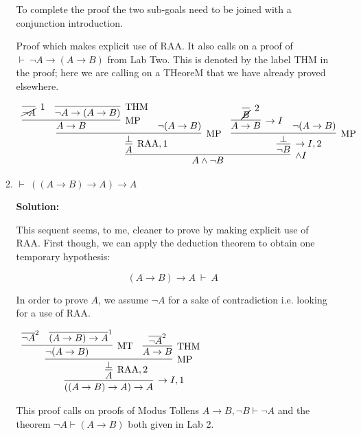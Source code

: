 \documentclass[11pt]{report}
\newcommand{\temp}[2]{{\overline{#2}}^{#1}}
\begin{document}
\begin{enumerate}
\begin{enumerate}
		To complete the proof the two sub-goals need to be joined with a conjunction introduction. 



		Proof which makes explicit use of RAA. It also calls on a proof of $\vdash \ \lnot A \to (A \to B)$ from Lab Two. This is denoted by the label THM in the proof; here we are calling on a THeoreM that we have already proved elsewhere.

		\begin{footnotesize}
		\begin{center}
			$\begin{array}{c}
				\infer[\land I]{A \land \lnot B}
					{\infer[\RAA,1]{A}
						{\infer[\MP]{\bot}
							{\infer[\MP]{A \to B}
								{\infer[1]{\cancel{\lnot A}}{}
								&
								\infer[\THM]{\lnot A \to (A \to B)}{}}
							&
							\lnot(A \to B)}}
					&
					\infer[\to I,2]{\lnot B}
						{\infer[\MP]{\bot}
							{\infer[\to I]{A \to B}
								{\infer[2]{\cancel{B}}{}}
							&
							\lnot(A \to B)}}}
			\end{array}$
		\end{center}
		\end{footnotesize}		
		
		\newpage
		\item $\vdash \ ((A \to B) \to A) \to A$  
		
		\textbf{Solution:}

		This sequent seems, to me, cleaner to prove by making explicit use of RAA. First though, we can apply the deduction theorem to obtain one temporary hypothesis: 
		
		$$(A \to B) \to A \ \vdash \ A$$

		In order to prove $A$, we assume $\lnot A$ for a sake of contradiction i.e. looking for a use of RAA. 

		\begin{center}
			$\begin{array}{c}
				\infer[\to I, 1]{((A \to B) \to A) \to A}
					{\infer[\RAA,2]{A}
						{\infer[\MP]{\bot}
							{\infer[\MT]{\lnot(A \to B)}
								{\temp{2}{\lnot A}
								&
								\temp{1}{(A \to B) \to A}}
							&
							\infer[\THM]{A \to B}
								{\temp{2}{\lnot A}}}}}
			\end{array}$
		\end{center}

		This proof calls on proofs of Modus Tollens $A \to B, \lnot B \vdash \lnot A$ and the theorem $\lnot A \vdash (A \to B)$ both given in Lab 2.


\end{enumerate}
\end{enumerate}
\end{document}
